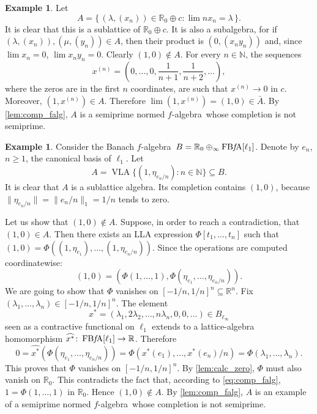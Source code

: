 \documentclass{memo-l}
\theoremstyle{definition}
\newtheorem{example}[theorem]{Example}
\theoremstyle{remark}
\numberwithin{section}{chapter}
\numberwithin{equation}{chapter}
\newcommand\N{\ensuremath{\mathbb{N}}}
\newcommand\R{\ensuremath{\mathbb{R}}}
\newcommand{\el}[1]{\ensuremath{\ell_{#1}}}
\newcommand{\falg}{$f\!$-algebra}
\newcommand{\VLA}{\operatorname{VLA}}
\newcommand{\FBFA}[1]{\operatorname{FB{\it f}\!A}[#1]}
\begin{document}
\begin{example}\label{ex:comp_falg_simple}
    Let
    \[
    A=\{\, (\lambda ,(x_n)) \in \R_0\oplus c : \lim nx_n=\lambda \, \}.
    \]
    It is clear that this is a sublattice of $\R_0\oplus c$. It is
    also a subalgebra, for if $(\lambda ,(x_n)),(\mu ,(y_n)) \in A$,
    then their product is $(0,(x_ny_n))$ and, since $\lim x_n=0$,
    $\lim x_ny_n=0$. Clearly $(1,0) \not\in A$. For every $n \in \N$,
    the sequences
    \[
    x^{(n)}=(0,\ldots ,0,\frac{1}{n+1},\frac{1}{n+2},\ldots ),
    \]
    where the zeros are in the first $n$ coordinates,
    are such that $x^{(n)}\to 0$ in $c$. Moreover, $(1,x^{(n)}) \in A$.
    Therefore $\lim (1,x^{(n)})=(1,0) \in \bar{A}$. By
    \cref{lem:comp_falg}, $A$ is a semiprime normed \falg\ whose
    completion is not semiprime.
\end{example}

\begin{example}\label{ex:comp_falg}
    Consider the Banach \falg\ $B=\R_0\oplus_\infty \FBFA{\el 1}$.
    Denote by $e_n$, $n\ge 1$, the canonical basis of $\el 1$. Let
    \[
    A=\VLA\{(1,\eta _{e_n/n}): n \in \N\}\subseteq B.
    \]
    It is clear that $A$ is a sublattice algebra. Its completion
    contains $(1,0)$, because $\|\eta _{e_n/n}\|=\|e_n/n\|_1=1/n$ tends
    to zero.

    Let us show that $(1,0) \not\in A$. Suppose, in order to reach a
    contradiction, that $(1,0) \in A$. Then there
    exists an LLA expression $\Phi [t_1,\ldots ,t_n]$ such that
    $(1,0)=\Phi ((1,\eta _{e_1}),\ldots ,(1,\eta _{e_n/n}))$. Since the
    operations are computed coordinatewise:
    \begin{equation}\label{eq:comp_falg}
        (1,0)=(\Phi (1,\ldots ,1),\Phi (\eta _{e_1},\ldots ,\eta
    _{e_n/n})).
    \end{equation}
    We are going to show that $\Phi $ vanishes on
    $[-1/n,1/n]^{n}\subseteq \R^{n}$. Fix $(\lambda _1,\ldots ,\lambda
    _n)\in [-1/n,1/n]^{n}$. The element
    \[
        x^{*}=(\lambda _1,2\lambda _2,\ldots ,n\lambda _n,0,0,\ldots )\in
        B_{\el \infty}
    \]
    seen as a contractive functional on $\el 1$ extends to a
    lattice-algebra homomorphism $\widehat{x^{*}}\colon \FBFA{\el
    1}\to \R$. Therefore
    \[
    0=\widehat{x^{*}}(\Phi (\eta _{e_1},\ldots ,\eta _{e_n/n}))=\Phi
    (x^{*}(e_1),\ldots ,x^{*}(e_n)/n)=\Phi (\lambda _1,\ldots ,\lambda
    _n).
    \]
    This proves that $\Phi $ vanishes on $[-1/n,1/n]^{n}$. By \cref{lem:calc_zero},
    $\Phi $ must also vanish on $\R_0$. This contradicts the fact
    that, according to \eqref{eq:comp_falg}, $1=\Phi (1,\ldots ,1)$ in
    $\R_0$. Hence $(1,0)\not\in A$. By \cref{lem:comp_falg}, $A$ is an
    example of a semiprime normed \falg\ whose completion is not
    semiprime.
\end{example}
\end{document}
